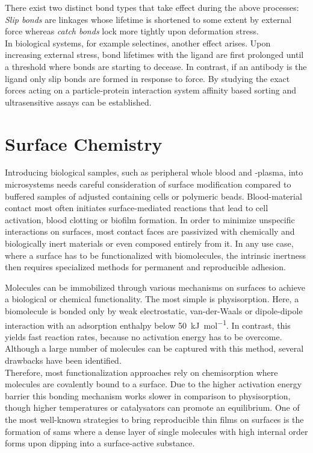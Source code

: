 There exist two distinct bond types that take effect during the above processes: \textit{Slip bonds} are linkages whose lifetime is shortened to some extent by external force whereas \textit{catch bonds} lock more tightly upon deformation stress. \\In biological systems, for example selectines, another effect arises. Upon increasing external stress, bond lifetimes with the ligand are first prolonged until a threshold where bonds are starting to decease.  In contrast, if an antibody is the ligand only slip bonds are formed in response to force.\cite{lit:bio:slip_bonds, lit:bio:catch_bonds} By studying the exact forces acting on a particle-protein interaction system affinity based sorting and ultrasensitive assays can be established.\cite{lit:bio:attomolarDetection}

\clearpage
\section{Surface Chemistry}
\label{sec:theo:chem}
Introducing biological samples, such as peripheral whole blood and -plasma, into microsystems needs careful consideration of surface modification compared to buffered samples of adjusted \pH containing cells or polymeric beads. Blood-material contact most often initiates surface-mediated reactions that lead to cell activation, blood clotting or biofilm formation.\cite{lit:bio:biomaterialInterfaces,lit:surf:microchannelEffectBlood} In order to minimize unspecific interactions on surfaces, most contact faces are passivized with chemically and biologically inert materials or even composed entirely from it. In any use case, where a surface has to be functionalized with biomolecules, the intrinsic inertness then requires specialized methods for permanent and reproducible adhesion.\cite{lit:chem:surface:methods,lit:surf:optimizedAdsorption}

Molecules can be immobilized through various mechanisms on surfaces to achieve a biological or chemical functionality. The most simple is physisorption. Here, a biomolecule is bonded only by weak electrostatic, van-der-Waals or dipole-dipole interaction with an adsorption enthalpy below \SI{50}{\kilo\joule\per\mole}.\cite{lit:surf:optimizedAdsorption} In contrast, this yields fast reaction rates, because no activation energy has to be overcome. Although a large number of molecules can be captured with this method, several drawbacks have been identified.\cite{lit:bio:ImmobilizationTechniques, lit:bio:immobilization:UV-ABs,lit:bio:physisorp:desorption, lit:chem:surfModOptics} \\
Therefore, most functionalization approaches rely on chemisorption where molecules are covalently bound to a surface. Due to the higher activation energy barrier this bonding mechanism works slower in comparison to physisorption, though higher temperatures or catalysators can promote an equilibrium. One of the most well-known strategies to bring reproducible thin films on surfaces is the formation of \glspl{sam} where a dense layer of single molecules with high internal order forms upon dipping into a surface-active substance.\cite{lit:chem:sin:langeDiss}

